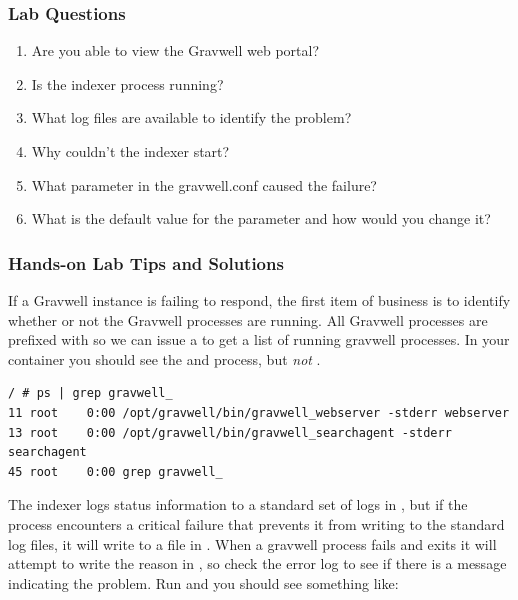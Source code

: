 \subsubsection{Lab Questions}

\begin{enumerate}
\item
  {Are you able to view the Gravwell web portal?}

\item
  {Is the indexer process running?}

\item
  {What log files are available to identify the problem?}

\item
  {Why couldn't the indexer start?}

\item
  {What parameter in the gravwell.conf caused the failure?}

\item
  {What is the default value for the parameter and how would you change
  it?}
\end{enumerate}

\subsubsection{Hands-on Lab Tips and Solutions}

If a Gravwell instance is failing to respond, the first item of
business is to identify whether or not the Gravwell processes are
running. All Gravwell processes are prefixed with  so we
can issue a  to get a list of running
gravwell processes. In your container you should see the
 and  process, but \emph{not}
.

\begin{Verbatim}[breaklines=true]
/ # ps | grep gravwell_
11 root    0:00 /opt/gravwell/bin/gravwell_webserver -stderr webserver
13 root    0:00 /opt/gravwell/bin/gravwell_searchagent -stderr searchagent
45 root    0:00 grep gravwell_
\end{Verbatim}

The indexer logs status information to a standard set of logs in
, but if the process encounters a critical failure
that prevents it from writing to the standard log files, it will write
to a file in . When a gravwell process fails and exits it
will attempt to write the reason in , so
check the error log to see if there is a message indicating the problem.
Run  and you should see something
like:

